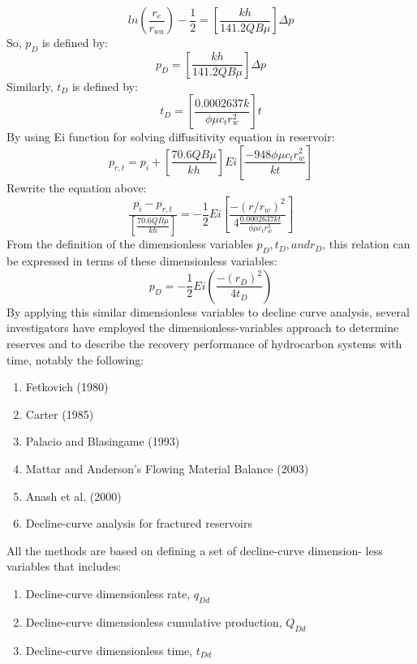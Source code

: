 \documentclass[12pt,a4paper]{report}
\begin{document}
\begin{equation}
ln(\frac{r_{e}}{r_{wa}}) - \frac{1}{2} = [\frac{kh}{141.2QB\mu}]\Delta p
\end{equation}
So, $p_{D}$ is defined by:
\begin{equation}
p_{D} = [\frac{kh}{141.2QB\mu}]\Delta p
\end{equation}
Similarly, $t_{D}$ is defined by:
\begin{equation}
t_{D} = [\frac{0.0002637k}{\phi \mu c_{t}r_{w}^{2}}]t
\end{equation}
By using Ei function for solving diffusitivity equation in reservoir:
\begin{equation}
p_{r,t} = p_{i} +[\frac{70.6QB\mu}{kh}]Ei[\frac{-948\phi \mu c_{t}r_{w}^{2}}{kt}]
\end{equation}
Rewrite the equation above:
\begin{equation}
\frac{p_{i} - p_{r,t}}{[\frac{70.6QB\mu}{kh}]}  = -\frac{1}{2}Ei[\frac{-(r/r_{w})^{2}}{4\frac{0.0002637kt}{\phi \mu c_{t}r_{w}^{2}}}]
\end{equation}
From the definition of the dimensionless variables $p_{D}, t_{D}, and r_{D}$, this relation can be expressed in terms of these dimensionless variables:
\begin{equation}
p_{D} = -\frac{1}{2}Ei(\frac{-(r_{D})^{2}}{4t_{D}})
\end{equation}
By applying this similar dimensionless variables to decline curve analysis, several investigators have employed the dimensionless-variables approach to determine reserves and to describe the recovery performance of hydrocarbon systems with time, notably the following:
\begin{enumerate}
	\item Fetkovich (1980)
	\item Carter (1985)
	\item Palacio and Blasingame (1993)
	\item Mattar and Anderson’s Flowing Material Balance (2003)
	\item Anash et al. (2000)
	\item Decline-curve analysis for fractured reservoirs
\end{enumerate}
All the methods are based on defining a set of decline-curve dimension- less variables that includes:
\begin{enumerate}
	\item Decline-curve dimensionless rate, $q_{Dd}$
	\item Decline-curve dimensionless cumulative production, $Q_{Dd}$
	\item Decline-curve dimensionless time, $t_{Dd}$
\end{enumerate}
\end{document}
